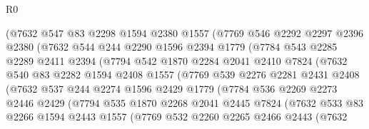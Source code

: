 \begin{lexlean}{R0}
\begin{coremodule}
              (@7632
                @547
                @83
                @2298
                @1594
                @2380
                @1557
                (@7769
                  @546
                  @2292
                  @2297
                  @2396
                  @2380
                  (@7632
                    @544
                    @244
                    @2290
                    @1596
                    @2394
                    @1779
                    (@7784
                      @543
                      @2285
                      @2289
                      @2411
                      @2394
                      (@7794
                        @542
                        @1870
                        @2284
                        @2041
                        @2410
                        @7824
                        (@7632
                          @540
                          @83
                          @2282
                          @1594
                          @2408
                          @1557
                          (@7769
                            @539
                            @2276
                            @2281
                            @2431
                            @2408
                            (@7632
                              @537
                              @244
                              @2274
                              @1596
                              @2429
                              @1779
                              (@7784
                                @536
                                @2269
                                @2273
                                @2446
                                @2429
                                (@7794
                                  @535
                                  @1870
                                  @2268
                                  @2041
                                  @2445
                                  @7824
                                  (@7632
                                    @533
                                    @83
                                    @2266
                                    @1594
                                    @2443
                                    @1557
                                    (@7769
                                      @532
                                      @2260
                                      @2265
                                      @2466
                                      @2443
                                      (@7632

\end{coremodule}
\end{lexlean}
